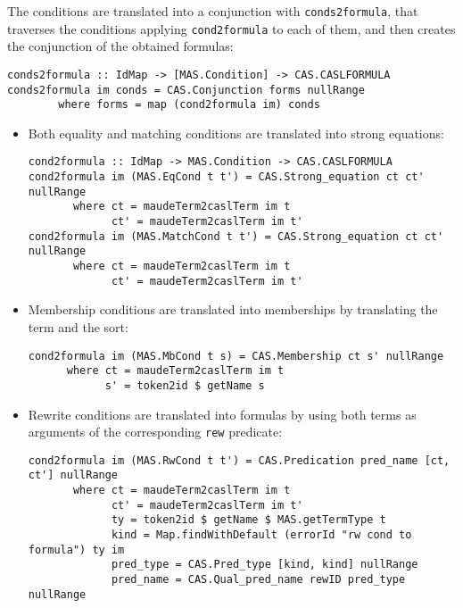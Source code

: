 The conditions are translated into a conjunction with \verb"conds2formula",
that traverses the conditions applying \verb"cond2formula" to each of them,
and then creates the conjunction of the obtained formulas:

{\codesize
\begin{verbatim}
conds2formula :: IdMap -> [MAS.Condition] -> CAS.CASLFORMULA
conds2formula im conds = CAS.Conjunction forms nullRange
        where forms = map (cond2formula im) conds
\end{verbatim}
}

\begin{itemize}

\item Both equality and matching conditions are translated into
strong equations:

{\codesize
\begin{verbatim}
cond2formula :: IdMap -> MAS.Condition -> CAS.CASLFORMULA
cond2formula im (MAS.EqCond t t') = CAS.Strong_equation ct ct' nullRange
       where ct = maudeTerm2caslTerm im t
             ct' = maudeTerm2caslTerm im t'
cond2formula im (MAS.MatchCond t t') = CAS.Strong_equation ct ct' nullRange
       where ct = maudeTerm2caslTerm im t
             ct' = maudeTerm2caslTerm im t'
\end{verbatim}
}

\item Membership conditions are translated into \CASL memberships by translating
the term and the sort:

{\codesize
\begin{verbatim}
cond2formula im (MAS.MbCond t s) = CAS.Membership ct s' nullRange
      where ct = maudeTerm2caslTerm im t
            s' = token2id $ getName s
\end{verbatim}
}

\item Rewrite conditions are translated into formulas by using both terms
as arguments of the corresponding \verb"rew" predicate: 

{\codesize
\begin{verbatim}
cond2formula im (MAS.RwCond t t') = CAS.Predication pred_name [ct, ct'] nullRange
       where ct = maudeTerm2caslTerm im t
             ct' = maudeTerm2caslTerm im t'
             ty = token2id $ getName $ MAS.getTermType t
             kind = Map.findWithDefault (errorId "rw cond to formula") ty im
             pred_type = CAS.Pred_type [kind, kind] nullRange
             pred_name = CAS.Qual_pred_name rewID pred_type nullRange
\end{verbatim}
}

\end{itemize}

